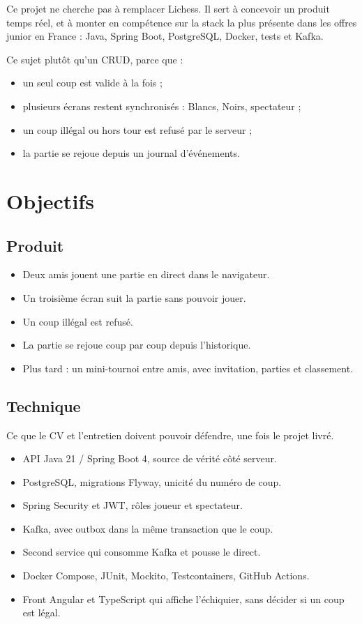 \documentclass[11pt,a4paper]{article}
\begin{document}
Ce projet ne cherche pas à remplacer Lichess. Il sert à concevoir un produit temps réel, et à monter en compétence sur la stack la plus présente dans les offres junior en France : Java, Spring Boot, PostgreSQL, Docker, tests et Kafka.

Ce sujet plutôt qu'un CRUD, parce que :

\begin{itemize}
  \item un seul coup est valide à la fois ;
  \item plusieurs écrans restent synchronisés : Blancs, Noirs, spectateur ;
  \item un coup illégal ou hors tour est refusé par le serveur ;
  \item la partie se rejoue depuis un journal d'événements.
\end{itemize}

\section{Objectifs}

\subsection{Produit}
\begin{itemize}
  \item Deux amis jouent une partie en direct dans le navigateur.
  \item Un troisième écran suit la partie sans pouvoir jouer.
  \item Un coup illégal est refusé.
  \item La partie se rejoue coup par coup depuis l'historique.
  \item Plus tard : un mini-tournoi entre amis, avec invitation, parties et classement.
\end{itemize}

\subsection{Technique}
Ce que le CV et l'entretien doivent pouvoir défendre, une fois le projet livré.

\begin{itemize}
  \item API Java 21 / Spring Boot 4, source de vérité côté serveur.
  \item PostgreSQL, migrations Flyway, unicité du numéro de coup.
  \item Spring Security et JWT, rôles joueur et spectateur.
  \item Kafka, avec outbox dans la même transaction que le coup.
  \item Second service qui consomme Kafka et pousse le direct.
  \item Docker Compose, JUnit, Mockito, Testcontainers, GitHub Actions.
  \item Front Angular et TypeScript qui affiche l'échiquier, sans décider si un coup est légal.
\end{itemize}
\end{document}
